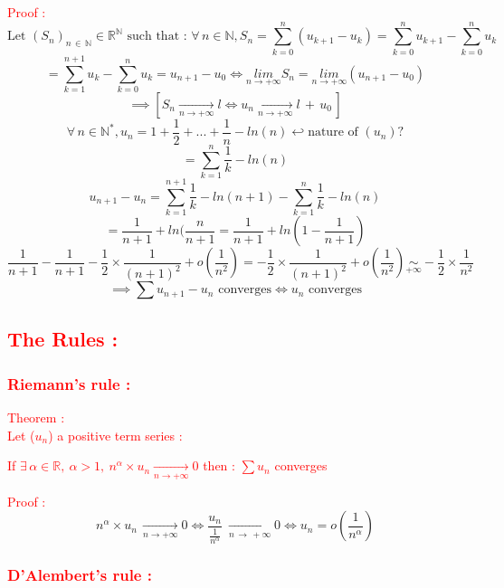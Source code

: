 \documentclass[a4paper,12pt]{article}
\begin{document}
\textcolor{red}{Proof :}
\[
\text{Let } (S_n)_{n \,\in \,\mathbb{N}} \in \mathbb{R}^\mathbb{N} \text{ such that : }
\forall \, n \in \mathbb{N}, S_n = \sum_{k=0}^{n}{(u_{k+1} - {u_k}) = \sum_{k=0}^{n}{u_{k+1}} - \sum_{k=0}^{n}{u_{k}}} 
\]
\[
= \sum_{k=1}^{n+1}{u_{k}} - \sum_{k=0}^{n}{u_{k}} = u_{n+1} - u_{0} \Leftrightarrow \underset{n \to +\infty}{lim} S_n = \underset{n \to +\infty}{lim} (u_{n+1} - u_0)
\]
\bigskip	
\[
\implies [S_n \underset{n\to+\infty}{\to} l \Leftrightarrow u_n \underset{n\to+\infty}{\to} l\, +\,u_0\,]
\]
\newpage
{} \[
\forall \, n\in \mathbb{N}^*, u_n = 1+ \frac{1}{2} +...+ \frac{1}{n} - ln(n) \hookleftarrow \text{nature of } (u_n)?
\]
\[
= \sum_{k=1}^{n}{\frac{1}{k}} - ln(n)
\]
\bigskip
\[
u_{n+1} -u_n = \sum_{k=1}^{n+1}{\frac{1}{k}} - ln(n+1) -\sum_{k=1}^{n}{\frac{1}{k}} - ln(n)
\]
\bigskip
\[
= \frac{1}{n+1} +ln(\frac{n}{n+1} = \frac{1}{n+1} + ln(1 -\frac{1}{n+1})
\]
\bigskip
\[
\frac{1}{n+1} - \frac{1}{n+1} - \frac{1}{2} \times \frac{1}{(n+1)^2} + o(\frac{1}{n^2}) = -\frac{1}{2} \times \frac{1}{(n+1)^2} + o(\frac{1}{n^2}) \underset{+\infty}{\sim} -\frac{1}{2} \times \frac{1}{n^2}
\]
\bigskip
\[
\implies \sum{u_{n+1} - u_n} \text{ converges} \Leftrightarrow u_n \text{ converges}
\]

\textcolor{red}{\subsection*{The Rules :}}

\textcolor{red}{\subsubsection*{Riemann's rule :}}
\bigskip
\textcolor{red}{Theorem :}\\

\textcolor{red}{Let ($u_n$) a positive term series :}
\bigskip

\textcolor{red}{If $\exists \, \alpha\in\mathbb{R}, \: \alpha>1, \: n^\alpha \times u_n \underset{n\to+\infty}{\to} 0$
then : $\sum{u_n}$ converges} 
\bigskip


\textcolor{red}{Proof :}\\

\[ n^\alpha \times u_n \, \underset{n\to+\infty}{\to} 0 \Leftrightarrow \frac{u_n}{\frac{1}{n^\alpha}} \: \underset{n\,\to \,+\infty}{\to} 0 \Leftrightarrow u_n = o(\frac{1}{n^\alpha})
\]
\bigskip

\newpage
\textcolor{red}{\subsubsection*{D'Alembert's rule :}}
\bigskip
\end{document}
